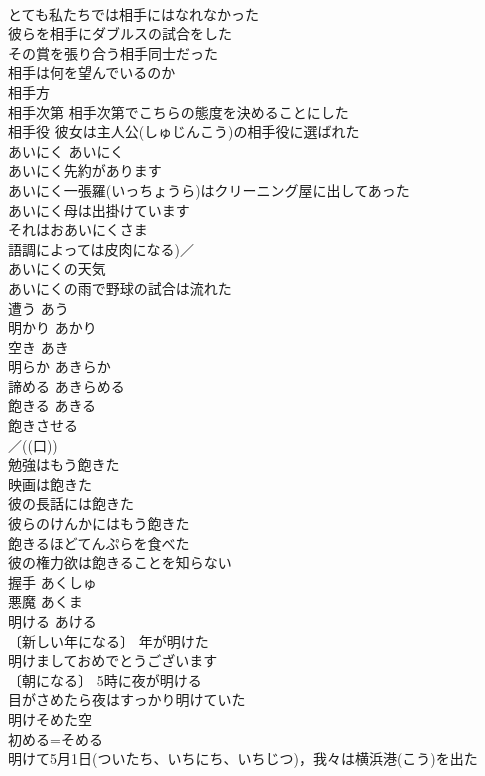 \documentclass[8pt]{extreport}
\begin{document}
\begin{CJK}{UTF8}{min}
\\	とても私たちでは相手にはなれなかった 
\\	彼らを相手にダブルスの試合をした 
\\	その賞を張り合う相手同士だった 
\\	相手は何を望んでいるのか 
\\	相手方 
\\	相手次第 相手次第でこちらの態度を決めることにした 
\\	相手役 彼女は主人公(しゅじんこう)の相手役に選ばれた 
\\	あいにく	あいにく	
\\	あいにく先約があります 
\\	あいにく一張羅(いっちょうら)はクリーニング屋に出してあった 
\\	あいにく母は出掛けています 
\\	それはおあいにくさま 
\\	語調によっては皮肉になる)／
\\	あいにくの天気 
\\	あいにくの雨で野球の試合は流れた 
\\	遭う	あう	
\\	明かり	あかり	
\\	空き	あき	
\\	明らか	あきらか	
\\	諦める	あきらめる	
\\	飽きる	あきる	
\\	飽きさせる 
\\	／((口)) 
\\	勉強はもう飽きた 
\\	映画は飽きた 
\\	彼の長話には飽きた 
\\	彼らのけんかにはもう飽きた 
\\	飽きるほどてんぷらを食べた 
\\	彼の権力欲は飽きることを知らない 
\\	握手	あくしゅ	
\\	悪魔	あくま	
\\	明ける	あける	
\\	〔新しい年になる〕 年が明けた 
\\	明けましておめでとうございます 
\\	〔朝になる〕 5時に夜が明ける 
\\	目がさめたら夜はすっかり明けていた 
\\	明けそめた空 
\\	初める=そめる　
\\	明けて5月1日(ついたち、いちにち、いちじつ)，我々は横浜港(こう)を出た 

\end{CJK}
\end{document}
